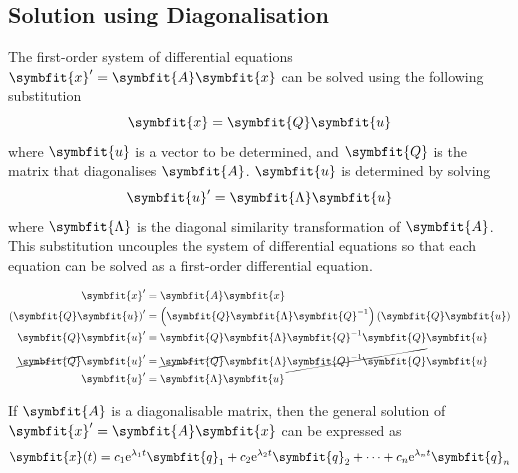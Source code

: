 \documentclass{article}
\begin{document}
\subsection{Solution using Diagonalisation}
\begin{theorem}
    The first-order system of differential equations
    \(\symbfit{x}' = \symbfit{A} \symbfit{x}\) can be solved using the
    following substitution
    \begin{equation*}
        \symbfit{x}=\symbfit{Q}\symbfit{u}
    \end{equation*}
    where \(\symbfit{u}\) is a vector to be determined, and
    \(\symbfit{Q}\) is the matrix that diagonalises \(\symbfit{A}\).
    \(\symbfit{u}\) is determined by solving
    \begin{equation*}
        \symbfit{u}' = \symbfit{\Lambda} \symbfit{u}
    \end{equation*}
    where \(\symbfit{\Lambda}\) is the diagonal similarity
    transformation of \(\symbfit{A}\). This substitution uncouples the
    system of differential equations so that each equation can be solved
    as a first-order differential equation.
\end{theorem}
\begin{solutionF}[Proof]
    \begingroup
    \allowdisplaybreaks
    \begin{align*}
        \symbfit{x}'                           & = \symbfit{A} \symbfit{x}                                                                           \\
        \left( \symbfit{Q}\symbfit{u} \right)' & = \left( \symbfit{Q}\symbfit{\Lambda} \symbfit{Q}^{-1} \right)\left( \symbfit{Q}\symbfit{u} \right) \\
        \symbfit{Q}\symbfit{u}'                & = \symbfit{Q}\symbfit{\Lambda} \symbfit{Q}^{-1} \symbfit{Q}\symbfit{u}                              \\
        \cancel{\symbfit{Q}}\symbfit{u}'       & = \cancel{\symbfit{Q}}\symbfit{\Lambda} \cancel{\symbfit{Q}^{-1} \symbfit{Q}}\symbfit{u}            \\
        \symbfit{u}'                           & = \symbfit{\Lambda} \symbfit{u}
    \end{align*}
    \endgroup
\end{solutionF}
\begin{theorem}
    If \(\symbfit{A}\) is a diagonalisable matrix, then the general
    solution of \(\symbfit{x}' = \symbfit{A} \symbfit{x}\) can be
    expressed as
    \begin{equation*}
        \symbfit{x}(t) = c_1 \e^{\lambda_1 t} \symbfit{q}_1 + c_2 \e^{\lambda_2 t} \symbfit{q}_2 + \cdots + c_n \e^{\lambda_n t} \symbfit{q}_n
    \end{equation*}
\end{theorem}
\end{document}
